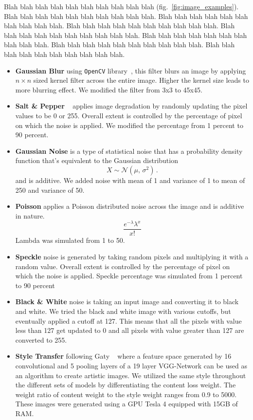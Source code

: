 \documentclass[10pt,twocolumn,letterpaper]{article}
\begin{document}
Blah blah blah blah blah blah blah blah blah blah (fig.~\ref{fig:image_examples}). Blah blah blah blah blah blah blah blah blah blah. Blah blah blah blah blah blah blah blah blah blah. Blah blah blah blah blah blah blah blah blah blah. Blah blah blah blah blah blah blah blah blah blah. Blah blah blah blah blah blah blah blah blah blah. Blah blah blah blah blah blah blah blah blah blah. Blah blah blah blah blah blah blah blah blah blah.

\begin{itemize}
    \item \textbf{Gaussian Blur} using \texttt{OpenCV} library~\cite{OpenCV_blur}, this filter blurs an image by applying $n \times n $ sized kernel filter across the entire image. Higher the kernel size leads to more blurring effect. We modified the filter from 3x3 to 45x45.\\
    \item \textbf{Salt \& Pepper} ~\cite{gonzalez_digital_2008} applies image degradation by randomly updating the pixel values to be 0 or 255. Overall extent is controlled by the percentage of pixel on which the noise is applied. We modified the percentage from 1 percent to 90 percent.\\
    \item \textbf{Gaussian Noise} is a type of statistical noise that has a probability density function that's equivalent to the Gaussian distribution \[
  X \sim \mathcal{N}(\mu,\,\sigma^{2})\,.
\]   and is additive. We added noise with mean of 1 and variance of 1 to mean of 250 and variance of 50.\\
    \item \textbf{Poisson} applies a Poisson distributed noise across the image and is additive in nature.
    \[
   \frac{{e^{ - \lambda } \lambda ^x }}{{x!}}
\] Lambda was simulated from 1 to 50.\\
    \item \textbf{Speckle} noise is generated by taking random pixels and multiplying it with a random value. Overall extent is controlled by the percentage of pixel on which the noise is applied. Speckle percentage was simulated from 1 percent to 90 percent
    \item \textbf{Black \& White} noise is taking an input image and converting it to black and white. We tried the black and white image with various cutoffs, but eventually applied a cutoff at 127. This means that all the pixels with value less than 127 get updated to 0 and all pixels with value greater than 127 are converted to 255.
    \item \textbf{Style Transfer} following Gaty \etal~\cite{gatys_neural_2015} where a feature space generated by 16 convolutional and 5 pooling layers of a 19 layer VGG-Network can be used as an algorithm to create artistic images. We utilized the same style throughout the different sets of models by differentiating the content loss weight. The weight ratio of content weight to the style weight ranges from 0.9 to 5000. These images were generated using a GPU Tesla 4 equipped with 15GB of RAM.
\end{itemize}
\end{document}
